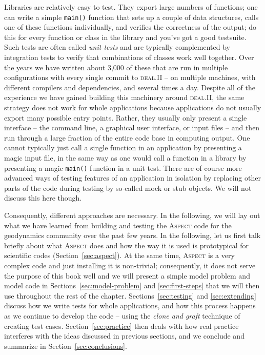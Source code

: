 \documentclass{article}
\newcommand{\dealii}{{\textsc{deal.II}}}
\newcommand{\aspect}{\textsc{Aspect}}
\begin{document}
Libraries are relatively easy to test. They export large numbers of
functions; one can write a simple \texttt{main()} function that sets up a
couple of data structures, calls one of these functions individually, and
verifies the correctness of the output; do
this for every function or class in the library and you've got a good
testsuite. Such tests are
often called \textit{unit tests} and are typically complemented by integration
tests to verify that combinations of classes work well together. Over the
years we have written about 3,000 of these that are run in multiple
configurations with every single commit to \dealii{} -- on multiple machines,
with different compilers and dependencies, and several times a day. Despite
all of the experience we have gained building this machinery around \dealii{},
the same strategy does not work for whole applications because applications do
not usually export many possible entry points. Rather, they usually only
present a single interface -- the command line, a graphical user interface, or
input files -- and then run through a large fraction of the entire code base
in computing output. One cannot typically just call a single function in an
application by presenting a magic input file, in the same way as one would
call a function in a library by presenting a magic \texttt{main()} function in
a unit test. There are of course more advanced ways of testing features of an
application in isolation by replacing other parts of the code during testing by so-called
mock or stub objects. We will not discuss this here though.

Consequently, different approaches are necessary. In the following, we will
lay out what we have learned from building and testing the \aspect{} code for the
geodynamics community over the past few years. In the following, let us first
talk briefly about what \aspect{} does and how the way it is used is
prototypical for scientific codes (Section~\ref{sec:aspect}). At the same time,
\aspect{} is a very complex code and just installing it is non-trivial;
consequently, it does not serve the purpose of this book well and we will
present a simple model problem and model code in
Sections~\ref{sec:model-problem} and \ref{sec:first-steps} that we
will then use throughout the rest of the chapter. Sections~\ref{sec:testing}
and \ref{sec:extending}
discuss how we write tests for whole applications, and how this process
happens as we continue to develop the code -- using the
\textit{clone and graft} technique of creating test
cases. Section~\ref{sec:practice} then deals with how real practice interferes
with the ideas discussed in previous sections, and we conclude and summarize
in Section~\ref{sec:conclusions}.
\end{document}
